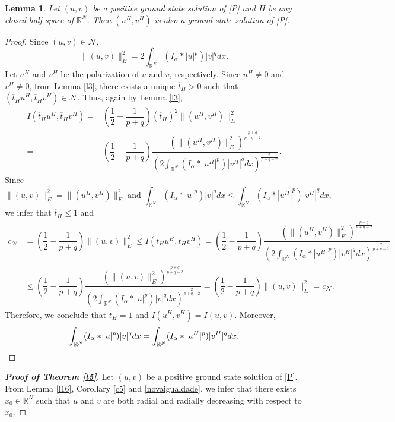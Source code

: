 \documentclass[12pt,a4paper]{article}
\newtheorem{lemma}[theorem]{Lemma}
\numberwithin{equation}{section}
\begin{document}
\begin{lemma}\label{l17}
Let $(u, v)$ be a positive ground state solution of \eqref{P} and $H$ be any closed half-space of $\mathbb{R}^N$. Then $(u^H, v^H)$ is also a ground state solution of \eqref{P}.
\end{lemma}
\begin{proof}
Since $(u, v)\in \mathcal{N}$, 
$$
\|(u, v)\|_{E}^{2} =2 \int_{\mathbb{R}^N} (I_\alpha \ast |u|^p)|v|^q dx.
$$
Let $u^H$ and $v^H$ be the polarization of $u$ and $v$, respectively. Since $u^H \neq 0$ and $v^H \neq 0$,  from Lemma \ref{l3}, there exists a unique $\overline{t}_H > 0$ such that $(\overline{t}_H u^H, \overline{t}_H v^H)\in \mathcal{N}$. Thus, again by Lemma \ref{l3},
\begin{align*}
I(\overline{t}_H u^H, \overline{t}_H v^H)= &\left(\dfrac{1}{2}-\dfrac{1}{p+q}\right)(\overline{t}_H)^2 \|(u^H, v^H)\|_{E}^{2}\\=&\left(\dfrac{1}{2}-\dfrac{1}{p+q}\right)\dfrac{(\|(u^H, v^H)\|_{E}^{2})^{\frac{p+q}{p+q-2}}}{\left(2\int_{\mathbb{R}^N} (I_\alpha \ast |u^H|^p)|v^H|^q dx \right)^{\frac{2}{p+q-2}}}.
\end{align*}
Since
$$
\|(u, v)\|_{E}^{2}=\|(u^H, v^H)\|_{E}^{2} \mbox{ \ \ \ and \ \ \ } \int_{\mathbb{R}^N} (I_\alpha \ast |u|^p)|v|^q dx \leq \int_{\mathbb{R}^N} (I_\alpha \ast |u^H|^p)|v^H|^q dx,
$$
we infer that $\overline{t}_H \leq 1$ and
\begin{align*}
c_\mathcal{N} & = \left(\dfrac{1}{2}-\dfrac{1}{p+q}\right) \|(u, v)\|_{E}^{2}\leq I(\overline{t}_H u^H, \overline{t}_H v^H) = \left(\dfrac{1}{2}-\dfrac{1}{p+q}\right)\dfrac{(\|(u^H, v^H)\|_{E}^{2})^{\frac{p+q}{p+q-2}}}{\left(2\int_{\mathbb{R}^N} (I_\alpha \ast |u^H|^p)|v^H|^q dx \right)^{\frac{2}{p+q-2}}} \\
& \leq \left(\dfrac{1}{2}-\dfrac{1}{p+q}\right)\dfrac{(\|(u, v)\|_{E}^{2})^{\frac{p+q}{p+q-2}}}{\left(2\int_{\mathbb{R}^N} (I_\alpha \ast |u|^p)|v|^q dx \right)^{\frac{2}{p+q-2}}} = \left(\dfrac{1}{2}-\dfrac{1}{p+q}\right) \|(u, v)\|_{E}^{2} = c_\mathcal{N}.
\end{align*}
Therefore, we conclude that $\overline{t}_H = 1$ and $I(u^H, v^H)=I(u,v)$. Moreover,
\begin{equation}\label{novaigualdade}
\int_{\mathbb{R}^N} (I_\alpha \ast |u|^p)|v|^q dx = \int_{\mathbb{R}^N} (I_\alpha \ast |u^H|^p)|v^H|^q dx. \qedhere
\end{equation}
\end{proof}

\begin{proof}[\bf{Proof of Theorem \ref{t5}}]
Let $(u, v)$ be a positive ground state solution of \eqref{P}. From Lemma \ref{l16}, Corollary \ref{c5} and \eqref{novaigualdade}, we infer that there exists $x_0 \in \mathbb{R}^N$ such that $u$ and $v$ are both radial and radially decreasing with respect to $x_0$.
\end{proof}
\end{document}
